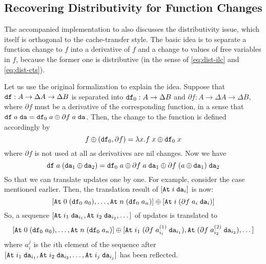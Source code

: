 \documentclass{article}
\theoremstyle{definition}
\begin{document}




\subsection{Recovering Distributivity for Function Changes}
\label{sec:distributivity-and-function-changes}

The accompanied implementation to \citet{GiarrussoRS19} also discusses 
the distributivity issue, which itself is orthogonal to the cache-transfer style.
The basic idea is to separate a function change to $f$ into a derivative of $f$ and a change to values of free variables in $f$, because 
the former one is distributive (in the sense of \ref{eq:dist-ilc} and \ref{eq:dist-cts}). 

Let us use the original formalization to explain the idea. 
Suppose that $\texttt{df} : A \to \Delta A \to \Delta B$ is separated into $\texttt{df}_0 : A \to \Delta B$ and $\partial f : A \to \Delta A \to \Delta B$, where 
$\partial f$ must be a derivative of the corresponding function, in a sense that $\texttt{df} \; a \; \texttt{da} = \texttt{df}_0 \; a \oplus \partial f \; a \; \texttt{da}$.
Then, the change to the function is defined accordingly by 
\[
 f \oplus (\texttt{df}_0, \partial f) = \lambda x. f \; x \oplus \texttt{df}_0 \; x
\]
where $\partial f$ is not used at all as derivatives are nil changes. Now we have 
\[
 \texttt{df} \; a \; (\texttt{da}_1 \oplus \texttt{da}_2) = \texttt{df}_0 \; a \oplus \partial f \; a \; \texttt{da}_1 \oplus \partial f \; (a \oplus \texttt{da}_1) \; \texttt{da}_2 
\]
So that we can translate updates one by one. For example, consider the  case mentioned earlier. 
Then, the translation result of $[\texttt{At} \; i \; \texttt{da}_i]$ is now:
\[
[ \texttt{At} \; 0 \; (\texttt{df}_0 \; a_0), \dots, \texttt{At} \; n \; (\texttt{df}_0 \; a_n) ] \oplus [\texttt{At} \; i \; (\partial f \; a_i \; \texttt{da}_i)]
\]
So, a sequence $[\texttt{At} \; {i_1} \; \texttt{da}_{i_1}, \texttt{At} \; {i_2} \; \texttt{da}_{i_2},\dots]$ of updates is translated to 
\[
[ \texttt{At} \; 0 \; (\texttt{df}_0 \; a_0), \dots, \texttt{At} \; n \; (\texttt{df}_0 \; a_n) ] \oplus [\texttt{At} \; i_1 \; (\partial f \; a^{(1)}_{i_i} \; \texttt{da}_{i_1}), \texttt{At} \; (\partial f \; a^{(2)}_{i_2} \; \texttt{da}_{i_2}), \dots]
\]
where $a^j_i$ is the $i$th element of the sequence after $[\texttt{At} \; {i_1} \; \texttt{da}_{i_1}, \texttt{At} \; {i_2} \; \texttt{da}_{i_2},\dots, \texttt{At} \; {i_j} \; \texttt{da}_{i_j}]$ has been reflected. 
\end{document}
